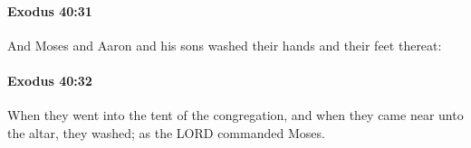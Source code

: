 		\paragraph{Exodus 40:31} %
			\label{EXODUS-40-31}

			And Moses and Aaron and his sons washed their hands and their feet thereat:


		\paragraph{Exodus 40:32} %
			\label{EXODUS-40-32}

			When they went into the tent of the congregation, and when they came near unto the altar, they washed; as the LORD commanded Moses.


